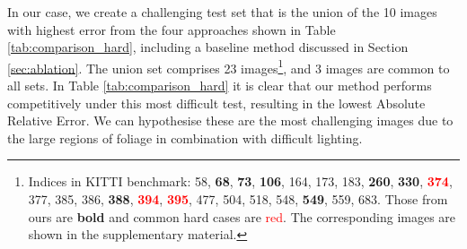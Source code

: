 \documentclass{bmvc2k}
\begin{document}
In our case, we create a challenging test set that is the union of the 10 images with highest error from the four approaches shown in Table \ref{tab:comparison_hard}, 
including a baseline method discussed in Section \ref{sec:ablation}. 
The union set comprises 23 images\footnote{Indices in KITTI benchmark: 58, \textbf{68}, \textbf{73}, \textbf{106}, 164, 173, 183, \textbf{260}, \textbf{330}, \textcolor{red}{\textbf{374}}, 377, 385, 386, \textbf{388}, \textcolor{red}{\textbf{394}}, \textcolor{red}{\textbf{395}}, 477, 504, 518, 548, \textbf{549}, 559, 683. Those from ours are \textbf{bold} and common hard cases are \textcolor{red}{red}. The corresponding images are shown in the supplementary material. }, and 3 images are common to all sets.
In Table \ref{tab:comparison_hard} it is clear that our method performs competitively under this most difficult test, resulting in the lowest Absolute Relative Error. 
We can hypothesise these are the most challenging images due to the large regions of foliage in combination with difficult lighting. 
\begin{table*}[ht]
\caption{Quantitative results on the challenging KITTI examples.}
\label{tab:comparison_hard}
\centering
\setlength
{}
\end{table*}
\end{document}
